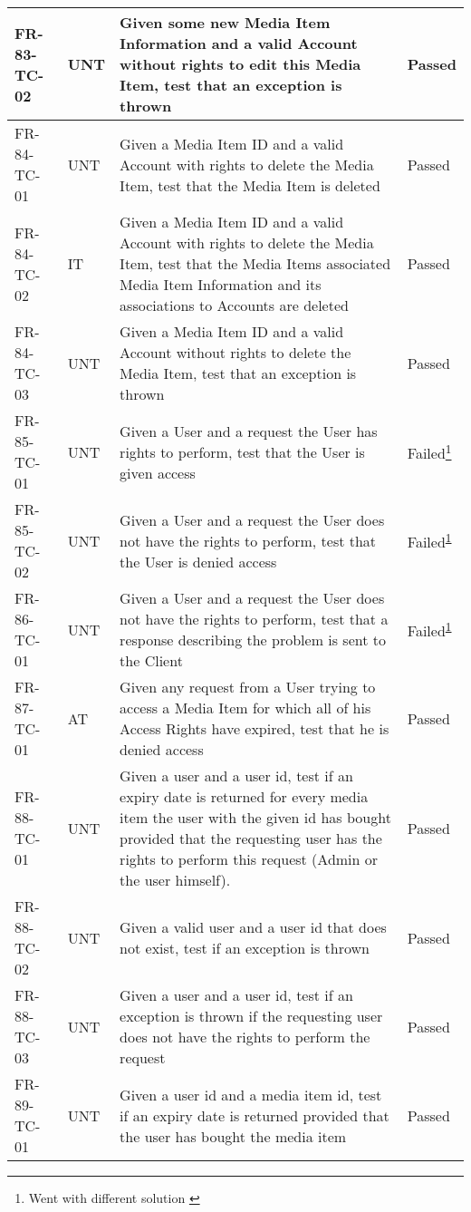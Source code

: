 \documentclass[../report.tex]{subfiles}
\newcommand{\footnoteref}[1]{\textsuperscript{\ref{#1}}}
\begin{document}
\begin{longtable}{|L{2.1cm}|L{0.8cm}|L{9cm}|L{1.2cm}|}
FR-83-TC-02&UNT&Given some new Media Item Information and a valid Account without rights to edit this Media Item, test that an exception is thrown&Passed  \\ \hline
FR-84-TC-01&UNT&Given a Media Item ID and a valid Account with rights to delete the Media Item, test that the Media Item is deleted&Passed  \\ \hline
FR-84-TC-02&IT&Given a Media Item ID and a valid Account with rights to delete the Media Item, test that the Media Items associated Media Item Information and its associations to Accounts are deleted&Passed  \\ \hline
FR-84-TC-03&UNT&Given a Media Item ID and a valid Account without rights to delete the Media Item, test that an exception is thrown&Passed  \\ \hline
FR-85-TC-01&UNT&Given a User and a request the User has rights to perform, test that the User is given access &Failed\footnote{Went with different solution \label{note3}}  \\ \hline
FR-85-TC-02&UNT&Given a User and a request the User does not have the rights to perform, test that the User is denied access&Failed\footnoteref{note3}  \\ \hline
FR-86-TC-01&UNT&Given a User and a request the User does not have the rights to perform, test that a response describing the problem is sent to the Client&Failed\footnoteref{note3}  \\ \hline
FR-87-TC-01&AT&Given any request from a User trying to access a Media Item for which all of his Access Rights have expired, test that he is denied access&Passed  \\ \hline
FR-88-TC-01&UNT&Given a user and a user id, test if an expiry date is returned for every media item the user with the given id has bought provided that the requesting user has the rights to perform this request (Admin or the user himself).&Passed  \\ \hline
FR-88-TC-02&UNT&Given a valid user and a user id that does not exist, test if an exception is thrown&Passed  \\ \hline
FR-88-TC-03&UNT&Given a user and a user id, test if an exception is thrown if the requesting user does not have the rights to perform the request&Passed  \\ \hline
FR-89-TC-01&UNT&Given a user id and a media item id, test if an expiry date is returned provided that the user has bought the media item&Passed  \\ \hline

\end{longtable}
\end{document}
